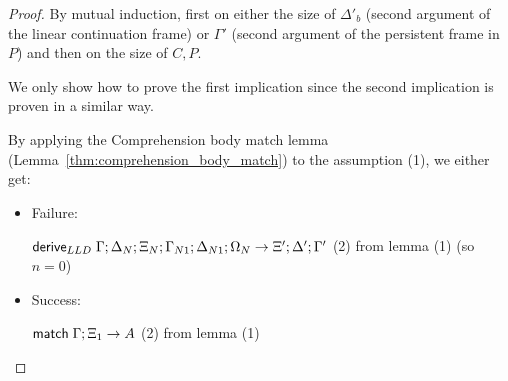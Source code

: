 \begin{proof}
By mutual induction, first on either the size of $\Delta'_b$ (second argument of the linear continuation frame) or $\Gamma'$ (second argument of the persistent frame in $P$) and then on the size of $C, P$.

We only show how to prove the first implication since the second implication is proven in a similar way.

By applying the Comprehension body match lemma (Lemma~\ref{thm:comprehension_body_match}) to the assumption (1), we either get:

\begin{itemize}
   \item Failure:
   
   $\mathsf{derive}_{LLD} \; \Gamma; \Delta_N; \Xi_N; \Gamma_{N1}; \Delta_{N1}; \Omega_N \rightarrow \Xi'; \Delta'; \Gamma'$ \hfill (2) from lemma (1) (so $n = 0$)\\
   
   \item Success:
   
   $\mathsf{match} \; \Gamma; \Xi_1 \rightarrow A$ \hfill (2) from lemma (1) \\
   

\end{itemize}
\end{proof}
